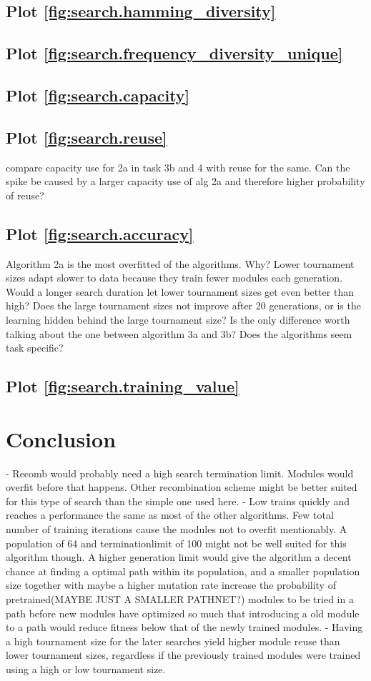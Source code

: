 \subsection{Plot \ref{fig:search.hamming_diversity}}
\subsection{Plot \ref{fig:search.frequency_diversity_unique}}
\subsection{Plot \ref{fig:search.capacity}}
\subsection{Plot \ref{fig:search.reuse}}
compare capacity use for 2a in task 3b and 4 with reuse for the same. Can the spike be caused by a larger capacity use of alg 2a and therefore higher probability of reuse?
\subsection{Plot \ref{fig:search.accuracy}}
Algorithm 2a is the most overfitted of the algorithms. Why?
Lower tournament sizes adapt slower to data because they train fewer modules each generation. Would a longer search duration let lower tournament sizes get even better than high?
Does the large tournament sizes not improve after 20 generations, or is the learning hidden behind the large tournament size? Is the only difference worth talking about the one between algorithm 3a and 3b? Does the algorithms seem task specific? 
\subsection{Plot \ref{fig:search.training_value}}

\section{Conclusion}
- Recomb would probably need a high search termination limit. Modules would overfit before that happens. Other recombination scheme might be better suited for this type of search than the simple one used here. 
- Low trains quickly and reaches a performance the same as most of the other algorithms. Few total number of training iterations cause the modules not to overfit mentionably. A population of 64 and terminationlimit of 100 might not be well suited for this algorithm though. A higher generation limit would give the algorithm a decent chance at finding a optimal path within its population, and a smaller population size together with maybe a higher mutation rate increase the probability of pretrained(MAYBE JUST A SMALLER PATHNET?) modules to be tried in a path before new modules have optimized so much that introducing a old module to a path would reduce fitness below that of the newly trained modules. - Having a high tournament size for the later searches yield higher module reuse than lower tournament sizes, regardless if the previously trained modules were trained using a high or low tournament size. 